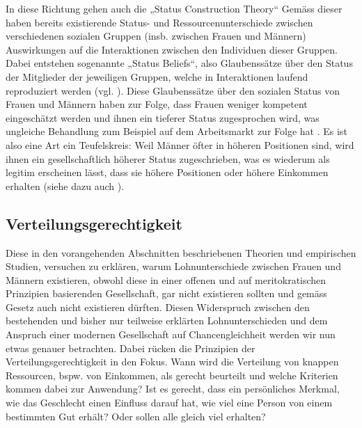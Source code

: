 \documentclass[a4paper,12pt]{article}
\renewcommand{\baselinestretch}{1.1}
\newif\ifcomments
\newcommand{\comment}[1]{%
    \ifcomments\marginpar{\renewcommand{\baselinestretch}{1}\tiny\hspace*{-1.1em}\colorbox{gray!20}%
    {\textcolor{red}{\parbox[t]{.9in}{\raggedright #1}}}}\fi}
\begin{document}
In diese Richtung gehen auch die „Status Construction Theory“ \citep{Ridgeway-1997,Ridgeway-2001} Gemäss dieser haben bereits existierende Status- und Ressourcenunterschiede zwischen verschiedenen sozialen Gruppen (insb. zwischen
Frauen und Männern) Auswirkungen auf die Interaktionen zwischen den Individuen
dieser Gruppen. Dabei entstehen sogenannte „Status Beliefs“, also Glaubenssätze
über den Status der Mitglieder der jeweiligen Gruppen, welche in Interaktionen
laufend reproduziert werden (vgl. \citealp{Goffman-1977}). Diese Glaubenssätze
über den sozialen Status von Frauen und Männern haben zur Folge, dass Frauen
weniger kompetent eingeschätzt werden und ihnen ein tieferer Status
zugesprochen wird, was ungleiche Behandlung zum Beispiel auf dem Arbeitsmarkt
zur Folge hat \citep{Ridgeway-1997}. Es ist also eine Art ein Teufelskreis:
Weil Männer öfter in höheren Positionen sind, wird ihnen ein gesellschaftlich
höherer Status zugeschrieben, was es wiederum als legitim erscheinen lässt,
dass sie höhere Positionen oder höhere Einkommen erhalten (siehe dazu auch
\citealp{Berger-etal-1972}).

\comment{Abschnitt zu Segregation \& Devaluation hier (siehe comment unten)?}

\subsection{Verteilungsgerechtigkeit}
\label{sec:ss3}

\comment{statistische D. hat viel mit Vorstellungen zu tun; ähnliche Hinweise
bei Literatur zur Abwertung von Frauenberufen; oder auch die Theorien zur
Spezialisierung aufgrund von Rollen}

Diese in den vorangehenden Abschnitten beschriebenen Theorien und empirischen
Studien, versuchen zu erklären, warum Lohnunterschiede zwischen Frauen und
Männern existieren, obwohl diese in einer offenen und auf meritokratischen
Prinzipien basierenden Gesellschaft, gar nicht existieren sollten und gemäss
Gesetz auch nicht existieren dürften. Diesen Widerspruch zwischen den
bestehenden und bisher nur teilweise erklärten Lohnunterschieden und dem
Anspruch einer modernen Gesellschaft auf Chancengleichheit werden wir nun etwas
genauer betrachten. Dabei rücken die Prinzipien der Verteilungsgerechtigkeit in
den Fokus. Wann wird die Verteilung von knappen Ressourcen, bspw. von
Einkommen, als gerecht beurteilt und welche Kriterien kommen dabei zur
Anwendung? Ist es gerecht, dass ein persönliches Merkmal, wie das Geschlecht
einen Einfluss darauf hat, wie viel eine Person von einem bestimmten Gut
erhält? Oder sollen alle gleich viel erhalten?
\end{document}
